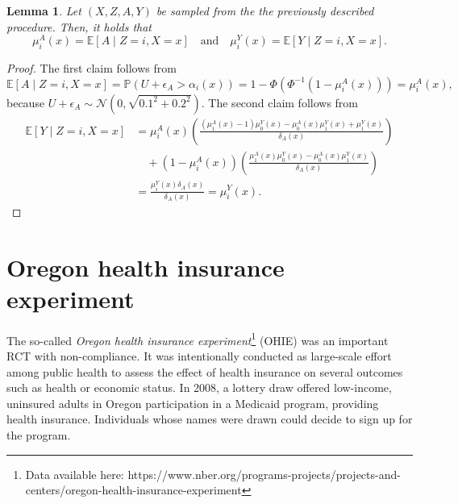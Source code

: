 \documentclass{article} %
\newcommand{\E}{\mathbb{E}}
\theoremstyle{definition}
\theoremstyle{plain}
\newtheorem{lemma}{Lemma}
\begin{document}
\begin{lemma}\label{lem:sim}
Let $(X, Z, A, Y)$ be sampled from the the previously described procedure. Then, it holds that 
\begin{equation}
    \mu_i^A(x) = \E[A \mid Z=i, X = x] \quad \text{and} \quad \mu_i^Y(x) = \E[Y \mid Z=i, X = x].
\end{equation}
\end{lemma}
\begin{proof}
The first claim follows from
\begin{equation}
    \E[A \mid Z = i, X = x] = \mathbb{P}\left(U + \epsilon_{A} > \alpha_i(x)\right) 
    = 1 - \Phi(\Phi^{-1}(1 - \mu_i^A(x))) = \mu_i^A(x),
\end{equation}
because $U + \epsilon_A \sim \mathcal{N}(0, \sqrt{0.1^2 + 0.2^2})$.
The second claim follows from
\begin{align}
\E[Y \mid Z = i, X = x] &= \mu_i^A(x) \left( \frac{(\mu_1^A(x) - 1)\mu_0^Y(x) - \mu_0^A(x)\mu_1^Y(x) + \mu_1^Y(x)}{\delta_A(x)}\right) \\& \quad + (1-\mu_i^A(x)) \left( \frac{\mu_1^A(x)\mu_0^Y(x) - \mu_0^A(x)\mu_1^Y(x)}{\delta_A(x)} \right) \\ &= \frac{\mu_i^Y(x) \delta_A(x)}{\delta_A(x)} = \mu_i^Y(x).
\end{align}

\end{proof}

\clearpage

\section{Oregon health insurance experiment}\label{app:real}

The so-called \emph{Oregon health insurance experiment}\footnote{Data available here: https://www.nber.org/programs-projects/projects-and-centers/oregon-health-insurance-experiment} (OHIE) \citep{Finkelstein.2012} was an important RCT with non-compliance. It was intentionally conducted as large-scale effort among public health to assess the effect of health insurance on several outcomes such as health or economic status. In 2008, a lottery draw offered low-income, uninsured adults in Oregon participation in a Medicaid program, providing health insurance. Individuals whose names were drawn could decide to sign up for the program.
\end{document}
